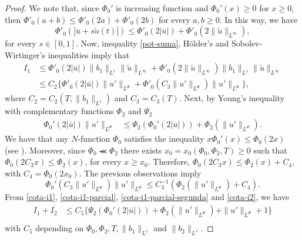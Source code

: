 \documentclass[twoside]{article}
\theoremstyle{remark}
\newcommand{\orlnor}{\|_{L^{\Phi}}}
\renewcommand{\leq}{\leqslant}
\renewcommand{\geq}{\geqslant}
\begin{document}
\begin{proof}
We note that, since $\Phi_0'$ is increasing function  and $\Phi_0'(x)\geq 0$ for $x\geq 0$, then $\Phi'_0(a+b)\leq \Phi'_0(2a)+\Phi'_0(2b)$ for every $a,b\geq 0$.
In this way, we have
\begin{equation}\label{pot-suma}
\Phi'_0(|\overline{u}+s\tilde{u}(t)|)\leq
\Phi'_0(2|\overline{u}|)+\Phi'_0(2\|\tilde{u}\|_{L^{\infty}}),
\end{equation}
for every $s \in [0,1]$.  Now,  inequality \eqref{pot-suma}, H\"older's and Sobolev-Wirtinger's inequalities imply that
\begin{equation}\label{cota-i1}
\begin{split}
I_1&
\leq \Phi'_0(2|\overline{u}|) \|b_1\|_{L^1} \|\tilde{u}\|_{L^{\infty}}+\Phi'_0(2\|\tilde{u}\|_{L^\infty})
 \|b_1\|_{L^1}\|\tilde{u}\|_{L^\infty}
\\
&\leq C_2 \bigg\{ \Phi'_0(2|\overline{u}|) \|u'\orlnor
+\Phi'_0(C_3\|u'\orlnor) \|u'\orlnor\bigg\},
\end{split}
\end{equation}
where $C_2=C_2(T, \|b_1\|_{L^1} )$ and $C_3=C_3(T)$. Next, by Young's inequality with complementary functions $\Phi_2$ and $\Psi_2$
\begin{equation}\label{cota-i1-parcial}
 \begin{split}
\Phi_0'(2|\overline{u}|) \|u'\orlnor
&\leq 
\Psi_2(\Phi_0'(2|\overline{u}|))+
\Phi_2(\|u'\orlnor).
\end{split}
\end{equation}
We have that any $N$-function $\Phi_0$ satisfies the inequality $x\Phi_0'(x)\leq \Phi_0(2x)$ (see \cite[p. 17]{rao1991theory} ). Moreover, since $\Phi_0\llcurly\Phi_2$ there exists $x_0=x_0(\Phi_0,\Phi_2,T)\geq 0$ such that $\Phi_0(2C_3x)\leq \Phi_2(x)$, for every $x\geq x_0$. Therefore, $\Phi_0(2C_3x)\leq \Phi_2(x)+C_4$, with $C_4=\Phi_0(2x_0)$. The previous observations imply
\begin{equation}\label{cota-i1-parcial-segunda}
\Phi_0'(C_3\|u'\orlnor) \|u'\orlnor
\leq 
C_3^{-1}(\Phi_2(\|u'\orlnor)+C_4).
\end{equation}
From \eqref{cota-i1}, \eqref{cota-i1-parcial}, \eqref{cota-i1-parcial-segunda} and \eqref{cota-i2}, we have
\begin{equation}\label{cota-i1-i2}
\begin{split}
I_1+I_2
&
\leq C_5
\bigg\{ 
\Psi_2(\Phi_0'(2|\overline{u}|))
+\Phi_2(\|u'\orlnor)
+\|u'\orlnor +1
\bigg\}\\
\end{split}
\end{equation}
with $C_5$ depending on $\Phi_0, \Phi_2, T, \|b_1\|_{L^1}$ and $\|b_2\|_{L^1} $.


\end{proof}
\end{document}
